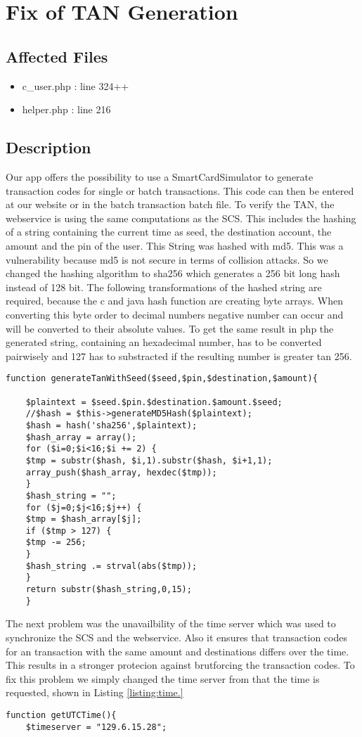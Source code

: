 \chapter{Fix of TAN Generation}
\section{Affected Files}
\begin{itemize}
	\item c\_user.php : line 324++
	\item helper.php : line 216
\end{itemize}

\section{Description}

Our app offers the possibility to use a SmartCardSimulator to generate transaction codes for single or batch transactions. This code can then be entered at our website or in the batch transaction batch file.
To verify the TAN, the webservice is using the same computations as the SCS. This includes the hashing of a string containing the current time as seed, the destination account, the amount and the pin of the user. This String was hashed with md5. This was a vulnerability because md5 is not secure in terms of collision attacks. So we changed the hashing algorithm to sha256 which generates a 256 bit long hash instead of 128 bit. The following transformations of the hashed string are required, because the c and java hash function are creating byte arrays. When converting this byte order to decimal numbers negative number can occur and will be converted to their absolute values. To get the same result in php the generated string, containing an hexadecimal number, has to be converted pairwisely and 127 has to substracted if the resulting number is greater tan 256.  \newline
\newline

\begin{lstlisting}[caption = Generation of a TAN using sha256, label=listing:sha256]
	function generateTanWithSeed($seed,$pin,$destination,$amount){
	
	$plaintext = $seed.$pin.$destination.$amount.$seed;
	//$hash = $this->generateMD5Hash($plaintext);
	$hash = hash('sha256',$plaintext);
	$hash_array = array();
	for ($i=0;$i<16;$i += 2) {
	$tmp = substr($hash, $i,1).substr($hash, $i+1,1);
	array_push($hash_array, hexdec($tmp));
	}
	$hash_string = "";
	for ($j=0;$j<16;$j++) {
	$tmp = $hash_array[$j];
	if ($tmp > 127) {
	$tmp -= 256;
	}
	$hash_string .= strval(abs($tmp));
	}
	return substr($hash_string,0,15);
	}
\end{lstlisting}
The next problem was the  unavailbility of the time server which was used to synchronize the SCS and the webservice. Also it ensures that transaction codes for an transaction with the same amount and destinations differs over the time. This results in a stronger protecion against brutforcing the transaction codes. 
To fix this problem we simply changed the time server from that the time is requested, shown in Listing \ref{listing:time.}

\begin{lstlisting}[caption= New TimeServer IP, label=listing:time]
	function getUTCTime(){
	$timeserver = "129.6.15.28";
\end{lstlisting}